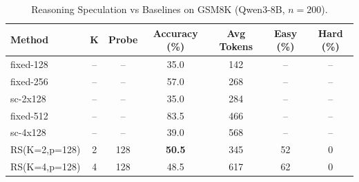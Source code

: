 \begin{table}[t]
\centering
\caption{Reasoning Speculation vs Baselines on GSM8K (Qwen3-8B, $n=200$).}
\label{tab:main_results}
\begin{tabular}{lcccccc}
\toprule
Method & K & Probe & Accuracy (\%) & Avg Tokens & Easy (\%) & Hard (\%) \\
\midrule
fixed-128 & -- & -- & 35.0 & 142 & -- & -- \\
fixed-256 & -- & -- & 57.0 & 268 & -- & -- \\
sc-2x128 & -- & -- & 35.0 & 284 & -- & -- \\
fixed-512 & -- & -- & 83.5 & 466 & -- & -- \\
sc-4x128 & -- & -- & 39.0 & 568 & -- & -- \\
\midrule
RS(K=2,p=128) & 2 & 128 & \textbf{50.5} & 345 & 52 & 0 \\
RS(K=4,p=128) & 4 & 128 & 48.5 & 617 & 62 & 0 \\
\bottomrule
\end{tabular}
\end{table}